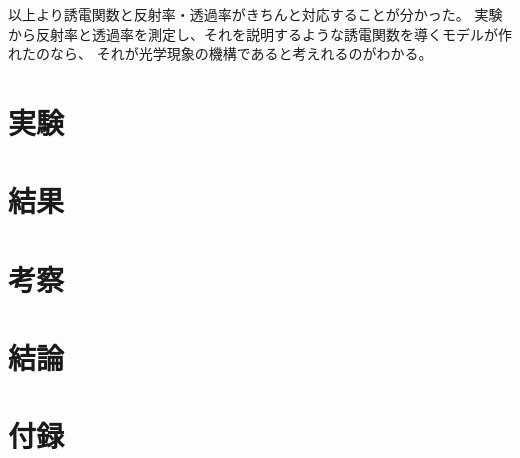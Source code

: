\documentclass[11pt,dvipdfmx,a4paper]{jsarticle}
\begin{document}
以上より誘電関数と反射率・透過率がきちんと対応することが分かった。
実験から反射率と透過率を測定し、それを説明するような誘電関数を導くモデルが作れたのなら、
それが光学現象の機構であると考えれるのがわかる。

\section{実験}

\section{結果}

\section{考察}

\section{結論}




\section*{付録}
\end{document}
